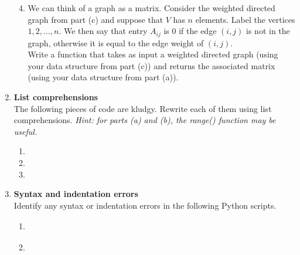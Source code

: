 \documentclass{article}
\begin{document}
\begin{enumerate}
\begin{enumerate}
\setcounter{enumii}{3}
\item We can think of a graph as a matrix.  Consider the weighted directed graph from part (c) and suppose that $V$ has $n$ elements.  Label the vertices $1, 2, \hdots, n$.  We then say that entry $A_{ij}$ is $0$ if the edge $(i, j)$ is not in the graph, otherwise it is equal to the edge weight of $(i, j)$. \\

Write a function that takes as input a weighted directed graph (using your data structure from part (c)) and returns the associated matrix (using your data structure from part (a)).
\end{enumerate}


\item \textbf{List comprehensions} \\
The following pieces of code are kludgy.  Rewrite each of them using list comprehensions.  \emph{Hint: for parts (a) and (b), the range() function may be useful.}

\begin{enumerate}
\item 
\end{enumerate}

\begin{enumerate}
\setcounter{enumii}{1}
\item 
\end{enumerate}

\begin{enumerate}
\setcounter{enumii}{2}
\item 
\end{enumerate}

\item \textbf{Syntax and indentation errors} \\
Identify any syntax or indentation errors in the following Python scripts.

\begin{enumerate}
\item
\lstset{numbers=left}
\begin{tabular}{c}

\end{tabular}
\end{enumerate}

\begin{enumerate}
\setcounter{enumii}{1}
\item
\lstset{numbers=left}
\begin{tabular}{c}

\end{tabular}
\end{enumerate}


\end{enumerate}
\end{document}
